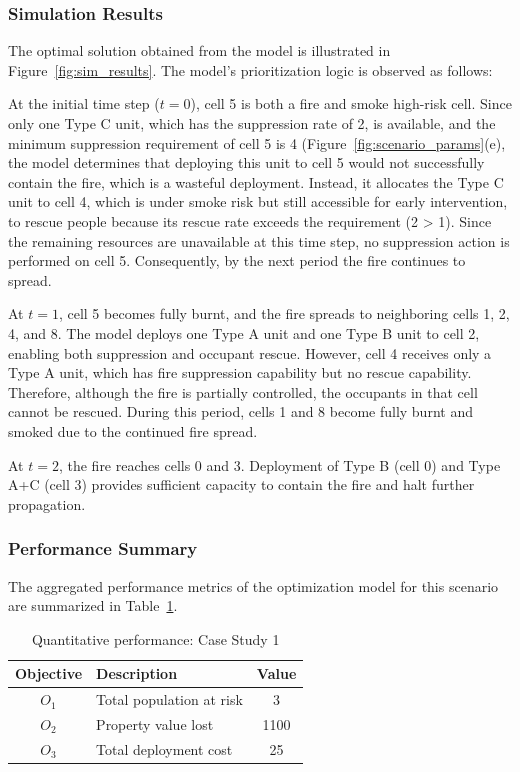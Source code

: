 \subsubsection{Simulation Results}
The optimal solution obtained from the model is illustrated in Figure~\ref{fig:sim_results}. The model's prioritization logic is observed as follows:

At the initial time step ($t=0$), cell 5 is both a fire and smoke high-risk cell. Since only one Type C unit, which has the suppression rate of 2, is available, and the minimum suppression requirement of cell 5 is 4 (Figure~\ref{fig:scenario_params}(e), the model determines that deploying this unit to cell 5 would not successfully contain the fire, which is a wasteful deployment. Instead, it allocates the Type C unit to cell 4, which is under smoke risk but still accessible for early intervention, to rescue people because its rescue rate exceeds the requirement (2 > 1). Since the remaining resources are unavailable at this time step, no suppression action is performed on cell 5. Consequently, by the next period the fire continues to spread.

At $t=1$, cell 5 becomes fully burnt, and the fire spreads to neighboring cells 1, 2, 4, and 8. The model deploys one Type A unit and one Type B unit to cell 2, enabling both suppression and occupant rescue. However, cell 4 receives only a Type A unit, which has fire suppression capability but no rescue capability. Therefore, although the fire is partially controlled, the occupants in that cell cannot be rescued. During this period, cells 1 and 8 become fully burnt and smoked due to the continued fire spread.

At $t=2$, the fire reaches cells 0 and 3. Deployment of Type B (cell 0) and Type A+C (cell 3) provides sufficient capacity to contain the fire and halt further propagation.


\subsubsection{Performance Summary}

The aggregated performance metrics of the optimization model for this scenario are summarized in Table~\ref{tab:performance}.

\begin{table}[!htb]
\caption{Quantitative performance: Case Study 1}
\label{tab:performance}
\centering
\begin{tabular}{|c|l|c|}
\hline
\textbf{Objective} & \textbf{Description} & \textbf{Value} \\ \hline
$O_1$ & Total population at risk & 3 \\ \hline
$O_2$ & Property value lost & 1100 \\ \hline
$O_3$ & Total deployment cost & 25 \\ \hline
\end{tabular}
\end{table}

